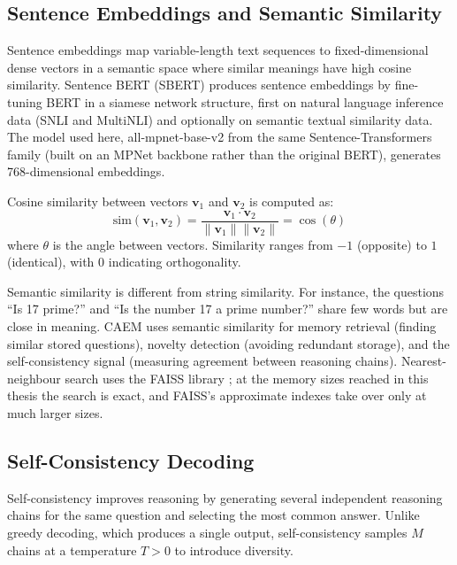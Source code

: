 \subsection{Sentence Embeddings and Semantic Similarity}

Sentence embeddings map variable-length text sequences to fixed-dimensional dense vectors in a semantic space where similar meanings have high cosine similarity. Sentence BERT (SBERT) \cite{reimers-gurevych-2019-sentence} produces sentence embeddings by fine-tuning BERT in a siamese network structure, first on natural language inference data (SNLI and MultiNLI) and optionally on semantic textual similarity data. The model used here, all-mpnet-base-v2 from the same Sentence-Transformers family (built on an MPNet backbone rather than the original BERT), generates 768-dimensional embeddings.

Cosine similarity between vectors $\mathbf{v}_1$ and $\mathbf{v}_2$ is computed as:
\begin{equation}
\text{sim}(\mathbf{v}_1, \mathbf{v}_2) = \frac{\mathbf{v}_1 \cdot \mathbf{v}_2}{\|\mathbf{v}_1\| \|\mathbf{v}_2\|} = \cos(\theta)
\end{equation}
where $\theta$ is the angle between vectors. Similarity ranges from $-1$ (opposite) to $1$ (identical), with $0$ indicating orthogonality.

Semantic similarity is different from string similarity. For instance, the questions ``Is 17 prime?'' and ``Is the number 17 a prime number?'' share few words but are close in meaning. CAEM uses semantic similarity for memory retrieval (finding similar stored questions), novelty detection (avoiding redundant storage), and the self-consistency signal (measuring agreement between reasoning chains). Nearest-neighbour search uses the FAISS library \cite{8733051}; at the memory sizes reached in this thesis the search is exact, and FAISS's approximate indexes take over only at much larger sizes.

\subsection{Self-Consistency Decoding}
\label{sec:lit-self-consistency}

Self-consistency \cite{wang2023selfconsistency} improves reasoning by generating several independent reasoning chains for the same question and selecting the most common answer. Unlike greedy decoding, which produces a single output, self-consistency samples $M$ chains at a temperature $T > 0$ to introduce diversity.


